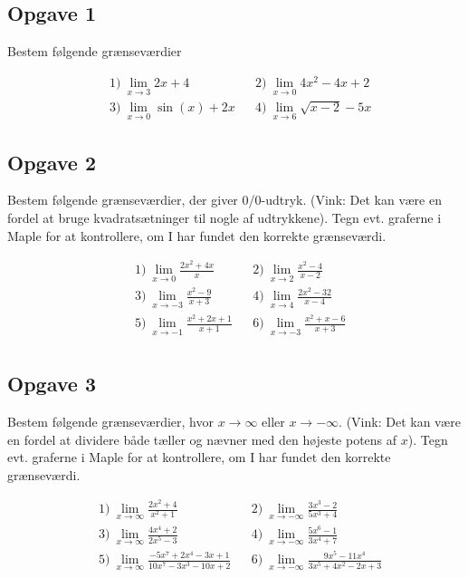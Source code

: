 \newpage
\subsection*{Opgave 1}
Bestem følgende grænseværdier

\begin{align*}
	&1) \ \lim_{x \to 3} 2x + 4 &  &2) \ \lim_{x \to 0} 4x^2 -4x + 2 \\
	&3) \ \lim_{x \to 0} \sin(x) + 2x &  &4) \ \lim_{x \to 6} \sqrt{x - 2} - 5x
\end{align*}

\subsection*{Opgave 2}
Bestem følgende grænseværdier, der giver 0/0-udtryk. (Vink: Det kan være en fordel at bruge kvadratsætninger til nogle af udtrykkene). Tegn evt. graferne i Maple for at kontrollere, om I har fundet den korrekte grænseværdi.

\begin{align*}
	&1) \ \lim_{x \to 0} \frac{2x^2+4x}{x} & &2) \ \lim_{x \to 2} \frac{x^2 - 4}{x - 2} \\
	&3) \ \lim_{x \to -3} \frac{x^2 - 9}{x+3} & &4) \ \lim_{x \to 4} \frac{2x^2 - 32}{x - 4} \\
	&5) \ \lim_{x \to -1} \frac{x^2 + 2x + 1}{x+1} & &6) \ \lim_{x \to -3} \frac{x^2+x-6}{x+3} \\
\end{align*}


\subsection*{Opgave 3}
Bestem følgende grænseværdier, hvor $x \to \infty$ eller $x \to -\infty$. 
(Vink: Det kan være en fordel at dividere både tæller og nævner med den højeste potens af $x$).
Tegn evt. graferne i Maple for at kontrollere, om I har fundet den korrekte grænseværdi.

\begin{align*}
	&1) \ \lim_{x \to \infty} \frac{2x^2 + 4}{x^2 + 1} & &2) \ \lim_{x \to -\infty} \frac{3x^3 - 2}{5x^3 + 4} \\
	&3) \ \lim_{x \to \infty} \frac{4x^4 + 2}{2x^5 - 3} & &4) \ \lim_{x \to -\infty} \frac{5x^6 - 1}{3x^4 + 7} \\
	&5) \ \lim_{x \to \infty} \frac{-5x^7 + 2x^4 -3x + 1}{10x^7	-3x^3-10x+2} & 
	&6) \ \lim_{x \to -\infty} \frac{9x^5 - 11x^4}{3x^5 + 4x^2 -2x + 3} \\
\end{align*}
\newpage


